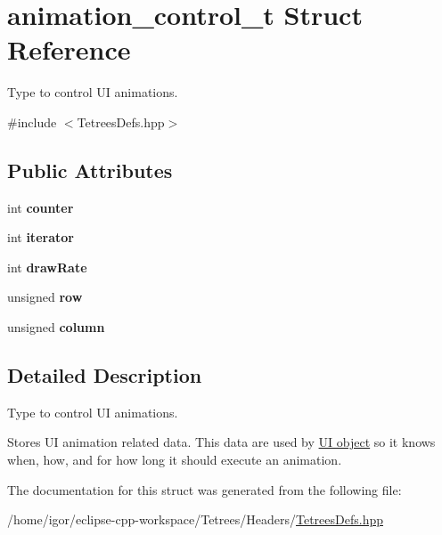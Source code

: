 \hypertarget{structanimation__control__t}{}\section{animation\+\_\+control\+\_\+t Struct Reference}
\label{structanimation__control__t}


Type to control UI animations.  




{\ttfamily \#include $<$Tetrees\+Defs.\+hpp$>$}

\subsection*{Public Attributes}
\begin{DoxyCompactItemize}
\item 
\mbox{\label{structanimation__control__t_a73ff393fa08828b3f7a20e7211cad769}} 
int {\bfseries counter}
\item 
\mbox{\label{structanimation__control__t_aef39107b1215226cb22a90eac0193b0d}} 
int {\bfseries iterator}
\item 
\mbox{\label{structanimation__control__t_a1b2d2b9a6c4a602c8f060a93b1adc072}} 
int {\bfseries draw\+Rate}
\item 
\mbox{\label{structanimation__control__t_a8ad7abe75413335a1e7984559ef2a32b}} 
unsigned {\bfseries row}
\item 
\mbox{\label{structanimation__control__t_a311b7da11edaaadae48b595082d3830f}} 
unsigned {\bfseries column}
\end{DoxyCompactItemize}


\subsection{Detailed Description}
Type to control UI animations. 

Stores UI animation related data. This data are used by \hyperlink{classTetreesEngine_a01bf1d438236d5f57129ffb22adf59ce}{UI object} so it knows when, how, and for how long it should execute an animation. 

The documentation for this struct was generated from the following file\+:\begin{DoxyCompactItemize}
\item 
/home/igor/eclipse-\/cpp-\/workspace/\+Tetrees/\+Headers/\hyperlink{TetreesDefs_8hpp}{Tetrees\+Defs.\+hpp}\end{DoxyCompactItemize}
